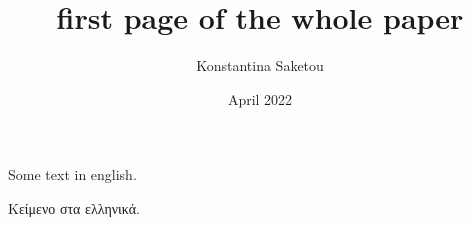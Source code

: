 \documentclass[12pt]{report}
\title{first page of the whole paper}
\author{Konstantina Saketou}
\date{April 2022}
\begin{document}
\maketitle

Some text in english.

Κείμενο στα ελληνικά.





\nocite{*}



\end{document}
